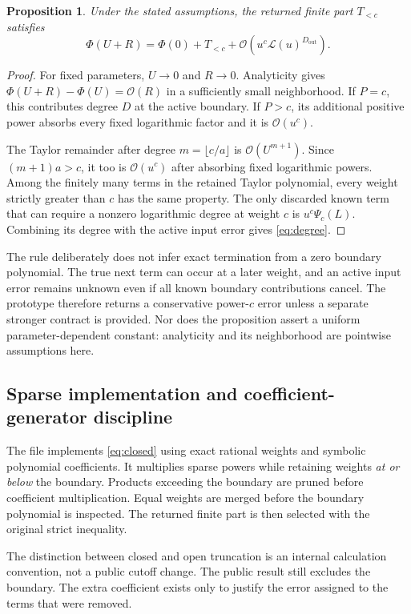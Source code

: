 \documentclass[11pt,letterpaper]{article}
\newcommand{\code}[1]{\texttt{\detokenize{#1}}}
\newcommand{\OO}{\mathcal{O}}
\newcommand{\LL}{\mathcal{L}}
\newtheorem{proposition}{Proposition}
\begin{document}
\begin{proposition}
Under the stated assumptions, the returned finite part $T_{<c}$ satisfies
\begin{equation}
 \Phi(U+R)=\Phi(0)+T_{<c}
       +\OO\!\left(u^c\LL(u)^{D_{\mathrm{out}}}\right).
 \label{eq:closedbound}
\end{equation}
\end{proposition}
\begin{proof}
For fixed parameters, $U\to0$ and $R\to0$. Analyticity gives
$\Phi(U+R)-\Phi(U)=\OO(R)$ in a sufficiently small neighborhood. If $P=c$, this contributes degree $D$ at the active boundary. If $P>c$, its additional positive power absorbs every fixed logarithmic factor and it is $\OO(u^c)$.

The Taylor remainder after degree $m=\lfloor c/a\rfloor$ is $\OO(U^{m+1})$. Since $(m+1)a>c$, it too is $\OO(u^c)$ after absorbing fixed logarithmic powers. Among the finitely many terms in the retained Taylor polynomial, every weight strictly greater than $c$ has the same property. The only discarded known term that can require a nonzero logarithmic degree at weight $c$ is $u^c\Psi_c(L)$. Combining its degree with the active input error gives \eqref{eq:degree}.
\end{proof}

The rule deliberately does not infer exact termination from a zero boundary polynomial. The true next term can occur at a later weight, and an active input error remains unknown even if all known boundary contributions cancel. The prototype therefore returns a conservative power-$c$ error unless a separate stronger contract is provided. Nor does the proposition assert a uniform parameter-dependent constant: analyticity and its neighborhood are pointwise assumptions here.

\subsection{Sparse implementation and coefficient-generator discipline}
The file \code{closed_frontier.py} implements \eqref{eq:closed} using exact rational weights and symbolic polynomial coefficients. It multiplies sparse powers while retaining weights \emph{at or below} the boundary. Products exceeding the boundary are pruned before coefficient multiplication. Equal weights are merged before the boundary polynomial is inspected. The returned finite part is then selected with the original strict inequality.

The distinction between closed and open truncation is an internal calculation convention, not a public cutoff change. The public result still excludes the boundary. The extra coefficient exists only to justify the error assigned to the terms that were removed.
\end{document}
